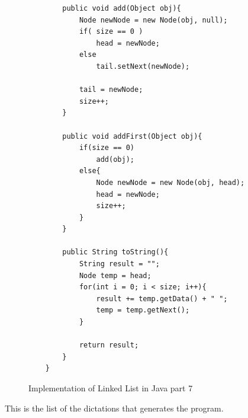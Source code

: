 \begin{figure}[H]
	\begin{lstlisting}
		public void add(Object obj){
			Node newNode = new Node(obj, null);
			if( size == 0 )
				head = newNode;
			else
				tail.setNext(newNode);
				
			tail = newNode;
			size++;
		}
		
		public void addFirst(Object obj){
			if(size == 0)
				add(obj);
			else{
				Node newNode = new Node(obj, head);
				head = newNode;
				size++;
			}
		}
		
		public String toString(){
			String result = "";
			Node temp = head;
			for(int i = 0; i < size; i++){
				result += temp.getData() + " ";
				temp = temp.getNext();
			}
			
			return result;
		}
	}
	\end{lstlisting}
	\caption{Implementation of Linked List in Java part 7}
	\label{fig29}
\end{figure}
This is the list of the dictations that generates the program.
